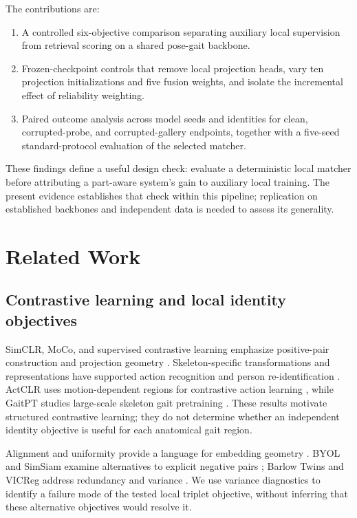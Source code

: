 \documentclass[pdflatex,iicol,sn-apa]{sn-jnl}
\begin{document}
The contributions are:
\begin{enumerate}
    \item A controlled six-objective comparison separating auxiliary local
    supervision from retrieval scoring on a shared pose-gait backbone.
    \item Frozen-checkpoint controls that remove local projection heads,
    vary ten projection initializations and five fusion weights, and isolate
    the incremental effect of reliability weighting.
    \item Paired outcome analysis across model seeds and identities for clean,
    corrupted-probe, and corrupted-gallery endpoints, together with a five-seed
    standard-protocol evaluation of the selected matcher.
\end{enumerate}

These findings define a useful design check: evaluate a deterministic local
matcher before attributing a part-aware system's gain to auxiliary local
training. The present evidence establishes that check within this pipeline;
replication on established backbones and independent data is needed to assess
its generality.

\section{Related Work}

\subsection{Contrastive learning and local identity objectives}

SimCLR, MoCo, and supervised contrastive learning emphasize positive-pair
construction and projection geometry
\citep{chen2020simclr,he2020moco,khosla2020supervised}. Skeleton-specific
transformations and representations have supported action recognition and
person re-identification \citep{thoker2021skeleton,rao2024skeleton}.
ActCLR uses motion-dependent regions for contrastive action learning
\citep{lin2023actclr}, while GaitPT studies large-scale skeleton gait
pretraining \citep{cosma2026gaitpt}. These results motivate structured
contrastive learning; they do not determine whether an independent identity
objective is useful for each anatomical gait region.

Alignment and uniformity provide a language for embedding geometry
\citep{wang2020alignment}. BYOL and SimSiam examine alternatives to explicit
negative pairs \citep{grill2020byol,chen2021simsiam}; Barlow Twins and VICReg
address redundancy and variance \citep{zbontar2021barlow,bardes2022vicreg}.
We use variance diagnostics to identify a failure mode of the tested local
triplet objective, without inferring that these alternative objectives would
resolve it.
\end{document}

